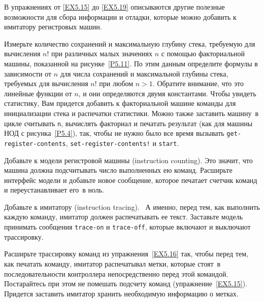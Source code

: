 В упражнениях от \ref{EX5.15} до 
\ref{EX5.19} описываются другие полезные возможности для
сбора информации и отладки, которые можно добавить к имитатору
регистровых машин.
\begin{exercise}{5.14}%
\label{EX5.14}%
Измерьте количество сохранений и максимальную глубину
стека, требуемую для вычисления $n!$ при различных малых
значениях $n$ с помощью факториальной машины, показанной на
рисунке~\ref{P5.11}.  
По этим данным определите формулы в
зависимости от $n$ для числа сохранений и максимальной
глубины стека, требуемых для вычисления $n!$ при любом
$n > 1$.  Обратите внимание, что это линейные функции от
$n$, и они определяются двумя константами.  Чтобы
увидеть статистику, Вам придется добавить к факториальной машине
команды для инициализации стека и распечатки статистики.  Можно также
заставить машину~в цикле считывать {\tt n}, вычислять факториал
и печатать результат (как для машины НОД с 
рисунка~\ref{P5.4}), так, чтобы не нужно было все время вызывать
{\tt get-register-contents},
{\tt set-register-contents!} и {\tt start}.
\end{exercise}
\begin{exercise}{5.15}%
\label{EX5.15}%
Добавьте к модели регистровой машины 
 (instruction counting).  Это значит, что
машина должна подсчитывать число выполненных ею команд.  Расширьте
интерфейс модели и добавьте новое сообщение, которое печатает счетчик
команд и переустанавливает его~в ноль.
\end{exercise}
\begin{exercise}{5.16}%
\label{EX5.16}%
Добавьте к имитатору 
 (instruction tracing). ~А именно, перед тем, как выполнить каждую команду,
имитатор должен распечатывать ее текст.  Заставьте модель принимать
сообщения {\tt trace-on} и {\tt trace-off}, которые
включают и выключают трассировку.
\end{exercise}
\begin{exercise}{5.17}%
\label{EX5.17}%
Расширьте трассировку команд из 
упражнения~\ref{EX5.16} так, чтобы перед тем, как печатать команду,
имитатор распечатывал метки, которые стоят~в последовательности
контроллера непосредственно перед этой командой.  Постарайтесь при
этом не помешать подсчету команд 
(упражнение~\ref{EX5.15}).  Придется заставить имитатор
хранить необходимую информацию о метках. 
\end{exercise}
